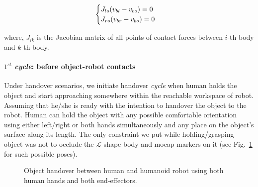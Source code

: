 \begin{equation}\label{vel_const}
\centering
\begin{cases}
J_{lo}(v_{bl} - v_{bo}) = 0\\
J_{ro}(v_{br} - v_{bo}) = 0\\
\end{cases}
\end{equation}

where, $J_{ik}$ is the Jacobian matrix of all points of contact forces between $i$-th body and $k$-th body.


\paragraph*{$1^{st}$ \textit{cycle}: before object-robot contacts} 
Under handover scenarios, we initiate handover \textit{cycle} when human holds the object and start approaching somewhere within the reachable workspace of robot. Assuming that he/she is ready with the intention to handover the object to the robot. Human can hold the object with any possible comfortable orientation using either left/right or both hands simultaneously and any place on the object's surface along its length. The only constraint we put while holding/grasping object was not to occlude the $\mathcal{L}$ shape body and mocap markers on it (see Fig.~\ref{fig:h-r-pipe-handover} for such possible poses).


\begin{figure}[hptb]
	\caption{Object handover between human and humanoid robot using both human hands and both end-effectors.}
	\label{fig:h-r-pipe-handover}
\end{figure}

